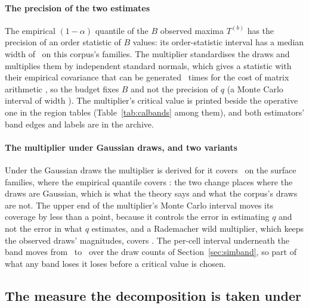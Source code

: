 \paragraph{The precision of the two estimates}
The empirical $(1-\alpha)$ quantile of the $B$ observed maxima $T^{(b)}$ has
the precision of an order statistic of $B$ values: its order-statistic
interval has a median width of \qEmpWidth\ on this corpus's families. The
multiplier standardises the draws and multiplies them by independent standard
normals, which gives a statistic with their empirical covariance that can be
generated \nMultiplier\ times for the cost of matrix arithmetic
\citep{chernozhukov2013gaussian}, so the budget fixes $B$ and not the
precision of $q$ (a Monte Carlo interval of width \qMultWidth). The
multiplier's critical value is printed beside the operative one in the
region tables (Table~\ref{tab:calbands} among them), and both estimators'
band edges and labels are in the archive.

\paragraph{The multiplier under Gaussian draws, and two variants}
Under the Gaussian draws the multiplier is derived for it covers
\covMultGaussWholeAtDesign\ on the surface families, where the empirical
quantile covers \covEmpGaussWholeAtDesign: the two change places where the
draws are Gaussian, which is what the theory says and what the corpus's draws
are not. The upper end of the multiplier's Monte Carlo interval moves its
coverage by less than a point, because it controls the error in estimating
$q$ and not the error in what $q$ estimates, and a Rademacher wild
multiplier, which keeps the observed draws' magnitudes, covers
\covRadHeavyWholeAtDesign. The per-cell interval underneath the band moves
from \covPercellBootThirtyThree\ to \covPercellBootOneThousand\ over the
draw counts of Section~\ref{sec:simband}, so part of what any band loses it
loses before a critical value is chosen.

\subsection{The measure the decomposition is taken under}
\label{app:decompmeasure}



